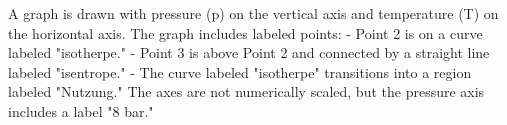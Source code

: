 A graph is drawn with pressure (p) on the vertical axis and temperature (T) on the horizontal axis. The graph includes labeled points:  
- Point 2 is on a curve labeled "isotherpe."  
- Point 3 is above Point 2 and connected by a straight line labeled "isentrope."  
- The curve labeled "isotherpe" transitions into a region labeled "Nutzung."  
The axes are not numerically scaled, but the pressure axis includes a label "8 bar."
